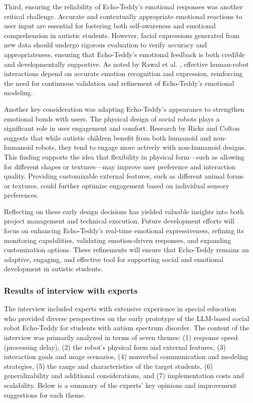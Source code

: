 Third, ensuring the reliability of Echo-Teddy’s emotional responses was another critical challenge. Accurate and contextually appropriate emotional reactions to user input are essential for fostering both self-awareness and emotional comprehension in autistic students. However, facial expressions generated from new data should undergo rigorous evaluation to verify accuracy and appropriateness, ensuring that Echo-Teddy's emotional feedback is both credible and developmentally supportive. As noted by Rawal et al. \cite{rawal2022facialemotionexpressionshumanrobot}, effective human-robot interactions depend on accurate emotion recognition and expression, reinforcing the need for continuous validation and refinement of Echo-Teddy’s emotional modeling.

Another key consideration was adapting Echo-Teddy’s appearance to strengthen emotional bonds with users. The physical design of social robots plays a significant role in user engagement and comfort. Research by Ricks and Colton \cite{5509327} suggests that while autistic children benefit from both humanoid and non-humanoid robots, they tend to engage more actively with non-humanoid designs. This finding supports the idea that flexibility in physical form—such as allowing for different shapes or textures—may improve user preference and interaction quality. Providing customizable external features, such as different animal forms or textures, could further optimize engagement based on individual sensory preferences.

Reflecting on these early design decisions has yielded valuable insights into both project management and technical execution. Future development efforts will focus on enhancing Echo-Teddy’s real-time emotional expressiveness, refining its monitoring capabilities, validating emotion-driven responses, and expanding customization options. These refinements will ensure that Echo-Teddy remains an adaptive, engaging, and effective tool for supporting social and emotional development in autistic students.

\subsubsection{Results of interview with experts}

The interview included experts with extensive experience in special education who provided diverse perspectives on the early prototype of the LLM-based social robot Echo-Teddy for students with autism spectrum disorder. The content of the interview was primarily analyzed in terms of seven themes: (1) response speed (processing delay), (2) the robot’s physical form and external features, (3) interaction goals and usage scenarios, (4) nonverbal communication and modeling strategies, (5) the range and characteristics of the target students, (6) generalizability and additional considerations, and (7) implementation costs and scalability. Below is a summary of the experts’ key opinions and improvement suggestions for each theme.

